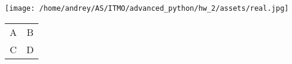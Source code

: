 \documentclass{article}
\begin{document}
\texttt{[image: /home/andrey/AS/ITMO/advanced\_python/hw\_2/assets/real.jpg]}
\begin{tabular}{c c}
A & B \\
C & D
\end{tabular}
\end{document}
